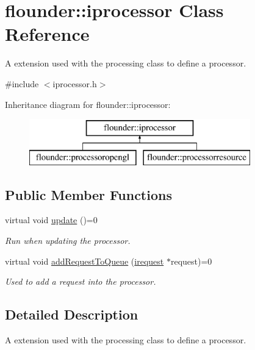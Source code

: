 \hypertarget{classflounder_1_1iprocessor}{}\section{flounder\+:\+:iprocessor Class Reference}
\label{classflounder_1_1iprocessor}


A extension used with the processing class to define a processor.  




{\ttfamily \#include $<$iprocessor.\+h$>$}

Inheritance diagram for flounder\+:\+:iprocessor\+:\begin{figure}[H]
\begin{center}
\leavevmode
\includegraphics[height=2.000000cm]{classflounder_1_1iprocessor}
\end{center}
\end{figure}
\subsection*{Public Member Functions}
\begin{DoxyCompactItemize}
\item 
virtual void \hyperlink{classflounder_1_1iprocessor_ad2edfece3465ec3dbe0a5feac26bdbc3}{update} ()=0
\begin{DoxyCompactList}\small\item\em Run when updating the processor. \end{DoxyCompactList}\item 
virtual void \hyperlink{classflounder_1_1iprocessor_ad721814a6a2c69f526527c7b2f57a11b}{add\+Request\+To\+Queue} (\hyperlink{classflounder_1_1irequest}{irequest} $\ast$request)=0
\begin{DoxyCompactList}\small\item\em Used to add a request into the processor. \end{DoxyCompactList}\end{DoxyCompactItemize}


\subsection{Detailed Description}
A extension used with the processing class to define a processor. 




